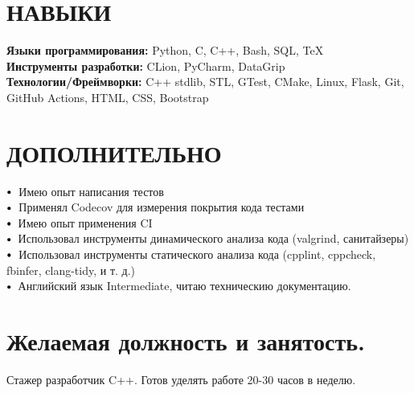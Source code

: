 \documentclass[letterpaper,11pt]{article}
\newcommand\sbullet[1][.5]{\mathbin{\vcenter{\hbox{\scalebox{#1}{$\bullet$}}}}}
\begin{document}
    
\vspace{-12pt}

\section{НАВЫКИ}
 \begin{itemize}[leftmargin=0.15in, label={}]
    \small{\item{
     \textbf{\normalsize{Языки программирования:}}{ \normalsize{Python, C, C++, Bash, SQL, TeX}} \\
     \textbf{\normalsize{Инструменты разработки:}}{ \normalsize{CLion, PyCharm, DataGrip}} \\
     \textbf{\normalsize{Технологии/Фреймворки:}}{\normalsize{ C++ stdlib, STL, GTest, CMake, Linux, Flask, Git, GitHub Actions, HTML, CSS, Bootstrap}} \\
    }}
 \end{itemize}
 \vspace{-15pt}
 
\section{ДОПОЛНИТЕЛЬНО}

$\sbullet[.75] \hspace{0.1cm}$ {{Имею опыт написания тестов}} \hspace{1.6cm} \\
$\sbullet[.75] \hspace{0.1cm}$ {{Применял Codecov для измерения покрытия кода тестами}} \hspace{2.59cm} \\
$\sbullet[.75] \hspace{0.2cm}${{Имею опыт применения CI}}\\

$\sbullet[.75] \hspace{0.2cm}${{Использовал инструменты динамического анализа кода (valgrind, санитайзеры)}} \hspace{1cm} \\
$\sbullet[.75] \hspace{0.1cm}$ {Использовал инструменты статического анализа кода (cpplint, cppcheck, fbinfer, clang-tidy, и т. д.)} \hspace{2.6cm} \\
$\sbullet[.75] \hspace{0.2cm}${{Английский язык Intermediate, читаю техническию документацию.}} \\

\section{Желаемая должность и занятость.}

Стажер разработчик C++. Готов уделять работе 20-30 часов в неделю.
\end{document}
